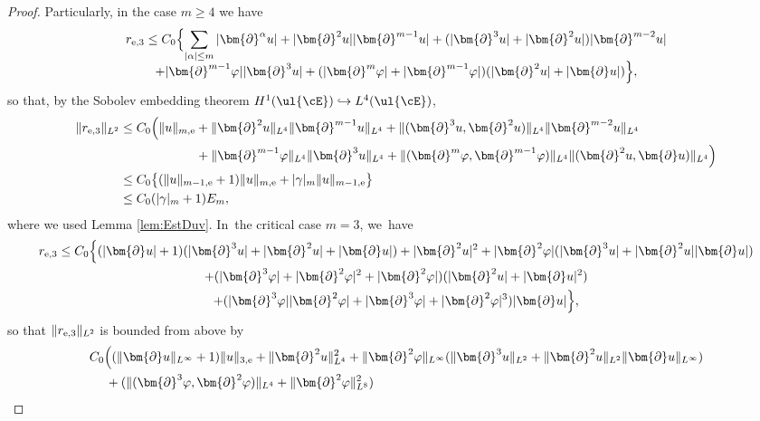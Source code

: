 \begin{proof}
\pagebreak[2]
\noindent
Particularly, in the case $m\geq 4$ we have
\begin{multline*}
r_{{\rm e},3}
\leq C_0 \Bigl\{ \sum_{|\alpha|\leq m}|\bm{\partial}^\alpha u|
+ |\bm{\partial}^2u||\bm{\partial}^{m-1}u| + (|\bm{\partial}^3u|+|\bm{\partial}^2u|)|\bm{\partial}^{m-2}u| \\[-5pt]
+ |\bm{\partial}^{m-1}\varphi||\bm{\partial}^3u| + (|\bm{\partial}^m\varphi|+|\bm{\partial}^{m-1}\varphi|)(|\bm{\partial}^2u|+|\bm{\partial}u|) \Bigr\},
\end{multline*}
so that, by the Sobolev embedding theorem $H^1(\ul{\cE}) \hookrightarrow L^4(\ul{\cE})$,
\begin{align*}
\|r_{{\rm e},3}\|_{L^2}
&\leq C_0 \Bigl(\|u\|_{m,{\rm e}} + \|\bm{\partial}^2u\|_{L^4} \|\bm{\partial}^{m-1}u\|_{L^4}
+ \|(\bm{\partial}^3u,\bm{\partial}^2u)\|_{L^4} \|\bm{\partial}^{m-2}u\|_{L^4} \\
&\hspace*{2.12cm}
+ \|\bm{\partial}^{m-1}\varphi\|_{L^4} \|\bm{\partial}^3u\|_{L^4}
+ \|(\bm{\partial}^m\varphi,\bm{\partial}^{m-1}\varphi)\|_{L^4} \|(\bm{\partial}^2u,\bm{\partial}u)\|_{L^4} \Bigr) \\
&\leq C_0 \bigl\{ (\|u\|_{m-1,{\rm e}}+1)\|u\|_{m,{\rm e}} + |\gamma|_m \|u\|_{m-1,{\rm e}} \bigr\} \\
&\leq C_0(|\gamma|_m+1)E_m,
\end{align*}
where we used Lemma \ref{lem:EstDuv}. In~the critical case $m=3$, we~have
\begin{multline*}
r_{{\rm e},3}
\leq C_0 \Bigl\{ (|\bm{\partial}u|+1)(|\bm{\partial}^3u|+|\bm{\partial}^2u|+|\bm{\partial}u|) + |\bm{\partial}^2u|^2
+ |\bm{\partial}^2\varphi|(|\bm{\partial}^3u| + |\bm{\partial}^2u||\bm{\partial}u|) \\
+ (|\bm{\partial}^3\varphi|+|\bm{\partial}^2\varphi|^2+|\bm{\partial}^2\varphi|)(|\bm{\partial}^2u|+|\bm{\partial}u|^2) \\
+ (|\bm{\partial}^3\varphi||\bm{\partial}^2\varphi|+|\bm{\partial}^3\varphi|+|\bm{\partial}^2\varphi|^3)|\bm{\partial}u| \Bigr\},
\end{multline*}
so that $\|r_{{\rm e},3}\|_{L^2}$ is bounded from above by
\begin{align*}
& C_0 \Bigl((\|\bm{\partial}u\|_{L^\infty}+1)\|u\|_{3,{\rm e}} + \|\bm{\partial}^2u\|_{L^4}^2
+ \|\bm{\partial}^2\varphi\|_{L^\infty}(\|\bm{\partial}^3u\|_{L^2} + \|\bm{\partial}^2u\|_{L^2}\|\bm{\partial}u\|_{L^\infty}) \\
&\quad\;
+ (\|(\bm{\partial}^3\varphi,\bm{\partial}^2\varphi)\|_{L^4} + \|\bm{\partial}^2\varphi\|_{L^8}^2)

\end{align*}
\end{proof}
